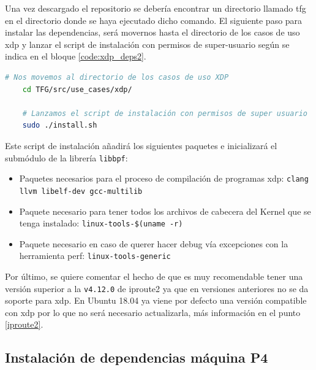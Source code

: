 \vspace{0.5cm}

Una vez descargado el repositorio se debería encontrar un directorio llamado \gls{tfg} en el directorio donde se haya ejecutado dicho comando. El siguiente paso para instalar las dependencias, será movernos hasta el directorio de los casos de uso \gls{xdp} y lanzar el script de instalación con permisos de super-usuario según se indica en el bloque \ref{code:xdp_deps2}.

\begin{lstlisting}[language= bash, style=Consola, caption={Instalación de dependencias XDP},label=code:xdp_deps2]
    # Nos movemos al directorio de los casos de uso XDP
    cd TFG/src/use_cases/xdp/
    
    # Lanzamos el script de instalación con permisos de super usuario
    sudo ./install.sh
\end{lstlisting}

\vspace{0.5cm}
Este script de instalación añadirá los siguientes paquetes e inicializará el submódulo de la librería \texttt{libbpf}:

\begin{itemize}
    \item Paquetes necesarios para el proceso de compilación de programas \gls{xdp}: \texttt{clang llvm libelf-dev gcc-multilib}
    \item Paquete necesario para tener todos los archivos de cabecera del Kernel que se tenga instalado:
    \texttt{linux-tools-\$(uname -r)}
    \item Paquete necesario en caso de querer hacer debug vía excepciones con la herramienta perf: \texttt{linux-tools-generic}
\end{itemize}

Por último, se quiere comentar el hecho de que es muy recomendable tener una versión superior a la \texttt{v4.12.0} de iproute2 ya que en versiones anteriores no se da soporte para \gls{xdp}. En Ubuntu 18.04 ya viene por defecto una versión compatible con \gls{xdp} por lo que no será necesario actualizarla, más información en el punto \ref{iproute2}.


\subsection{Instalación de dependencias máquina P4}


